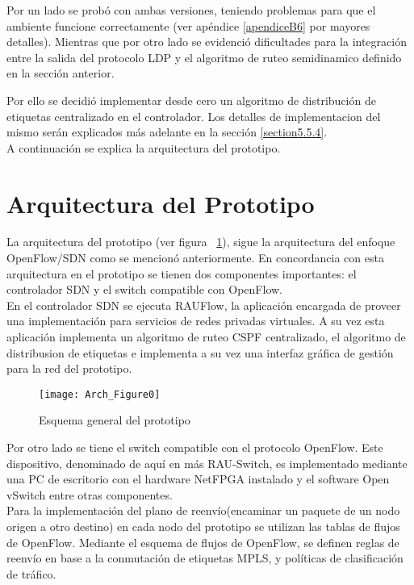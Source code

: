 Por un lado se prob\'o con ambas versiones, teniendo problemas para que el ambiente funcione correctamente (ver apéndice \ref{apendiceB6} por mayores detalles). Mientras que por otro lado se evidenci\'o dificultades para la integración entre la salida del protocolo LDP y el algoritmo de ruteo semidinamico definido en la sección anterior.

Por ello se decidi\'o implementar desde cero un algoritmo de distribución de etiquetas centralizado en el controlador. Los detalles de implementacion del mismo ser\'an explicados m\'as adelante en la sección \ref{section5.5.4}.\\

A continuación se explica la arquitectura del prototipo. 

\section{Arquitectura del Prototipo}

La arquitectura del prototipo (ver figura ~\ref{fig:OpenSourceRArch0}), sigue la arquitectura del enfoque OpenFlow/SDN como se mencion\'o anteriormente. En concordancia con esta arquitectura en el prototipo se tienen dos componentes importantes: el controlador SDN y el switch compatible con OpenFlow.\\

En el controlador SDN se ejecuta RAUFlow, la aplicaci\'on encargada de proveer una implementaci\'on para servicios de redes privadas virtuales. A su vez esta aplicaci\'on implementa un algoritmo de ruteo CSPF centralizado, el algoritmo de distribusion de etiquetas e implementa a su vez una interfaz gr\'afica de gesti\'on para la red del prototipo.\\

\begin{figure}[htbp!] 
\centering    
\texttt{[image: Arch\_Figure0]}
\caption[OpenSourceRArch0]{Esquema general del prototipo}
\label{fig:OpenSourceRArch0}
\end{figure}

Por otro lado se tiene el switch compatible con el protocolo OpenFlow. Este dispositivo, denominado de aqu\'i en m\'as RAU-Switch, es implementado mediante una PC de escritorio con el hardware NetFPGA instalado y el software Open vSwitch entre otras componentes.\\ 

Para la implementaci\'on del plano de reenvío(encaminar un paquete de un nodo origen a otro destino) en cada nodo del prototipo se utilizan las tablas de flujos de OpenFlow. Mediante el esquema de flujos de OpenFlow, se definen reglas de reenv\'io en base a la conmutaci\'on de etiquetas MPLS, y pol\'iticas de clasificaci\'on de tr\'afico.\\


